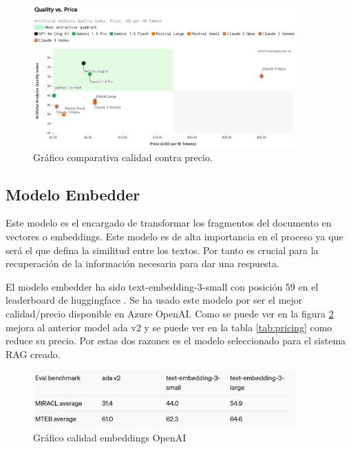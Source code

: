 \begin{figure}[]
\centering
\includegraphics[width=0.9\textwidth]{figuras/capitulo6/quality_price.png}
\caption{Gráfico comparativa calidad contra precio. \citep{artificialanalysis}}
\label{fig:quality_price}
\end{figure}

\subsection{Modelo Embedder}

Este modelo es el encargado de transformar los fragmentos del documento en vectores o embeddings. Este modelo es de alta importancia en el proceso ya que será el que defina la similitud entre los textos. Por tanto es crucial para la recuperación de la información necesaria para dar una respuesta.

El modelo embedder ha sido text-embedding-3-small con posición 59 en el leaderboard de huggingface \citep{leadhugging}. Se ha usado este modelo por ser el mejor calidad/precio disponible en Azure OpenAI. Como se puede ver en la figura \ref{fig:emb_quality} mejora al anterior model ada v2 y se puede ver en la tabla \ref{tab:pricing} como reduce su precio. Por estas dos razones es el modelo seleccionado para el sistema RAG creado.

\begin{figure}[h]
\centering
\includegraphics[width=0.9\textwidth]{figuras/capitulo6/emb_quality.png}
\caption{Gráfico calidad embeddings OpenAI \citep{openai}}
\label{fig:emb_quality}
\end{figure}

